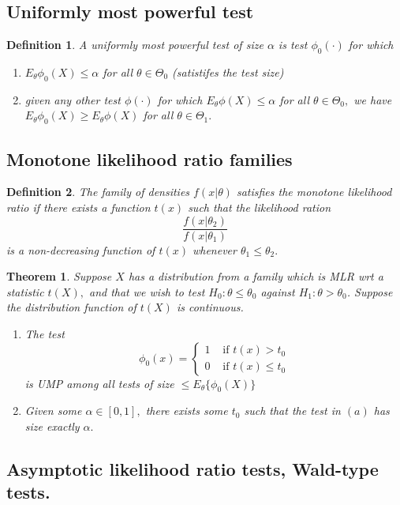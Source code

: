\documentclass[12pt]{report} \addtolength{\textheight}{2in}
\newtheorem{defn}{Definition}
\newtheorem{thm}{Theorem}
\newcommand{\Tif}{\text{  if   }}
\begin{document}
\subsection*{Uniformly most powerful test}
\begin{defn} A uniformly most powerful test of size $\alpha$ is test $\phi_{0}(\cdot)$ for which
\begin{enumerate}
\item[(i)] $E_{\theta} \phi_{0} (X) \leq \alpha$ for all $\theta \in \Theta_{0}$ (satistifes the test size)
\item[(ii)] given any other test $\phi(\cdot)$ for which $E_{\theta} \phi(X) \leq \alpha$ for all $\theta \in \Theta_{0},$ we have $E_{\theta} \phi_{0}(X) \geq E_{\theta} \phi(X)$ for all $\theta \in \Theta_{1}.$
\end{enumerate} 
\end{defn}
\subsection*{Monotone likelihood ratio families}
\begin{defn}
The family of densities $f(x|\theta)$ satisfies the monotone likelihood ratio if there exists a function $t(x)$ such that the likelihood ration
\begin{displaymath}
\frac{f(x|\theta_2)}{f(x|\theta_1)} 
\end{displaymath}
is a non-decreasing function of $t(x)$ whenever $\theta_1 \leq \theta_2.$
\end{defn}
\begin{thm}
Suppose $X$ has a distribution from a family which is MLR wrt a statistic $t(X),$ and that we wish to test $H_0 : \theta \leq \theta_{0} $ against $H_1: \theta > \theta_0$. Suppose the distribution function of $t(X)$ is continuous.
\begin{enumerate}
\item[(a)] The test 
\begin{displaymath}
\phi_{0}(x) =
\begin{cases}
1 & \Tif t(x) > t_0\\
0 & \Tif t(x) \leq t_0
\end{cases}
\end{displaymath}
is UMP among all tests of size $\leq E_{\theta} \{\phi_{0}(X)\}$
\item[(b)] Given some $\alpha \in [0,1],$ there exists some $t_0$ such that the test in $(a)$ has size exactly $\alpha.$
\end{enumerate} 
\end{thm}
\subsection*{Asymptotic likelihood ratio tests, Wald-type tests.}
 
\end{document}
